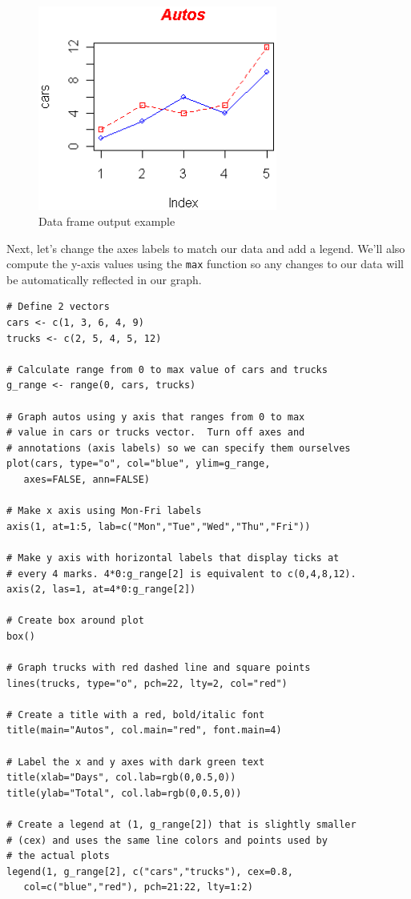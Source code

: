 \documentclass[10pt]{book}
\begin{document}
\begin{figure}[H]
    \begin{flushleft}
        \includegraphics[width=0.7\textwidth]{line_script3.png}
        \caption{Data frame output example}
        \label{fig:dataframe}
    \end{flushleft}
\end{figure}

Next, let's change the axes labels to match our data and add a legend. We'll also compute the y-axis values using the \texttt{max} function so any changes to our data will be automatically reflected in our graph.

\begin{lstlisting}
# Define 2 vectors
cars <- c(1, 3, 6, 4, 9)
trucks <- c(2, 5, 4, 5, 12)

# Calculate range from 0 to max value of cars and trucks
g_range <- range(0, cars, trucks)

# Graph autos using y axis that ranges from 0 to max 
# value in cars or trucks vector.  Turn off axes and 
# annotations (axis labels) so we can specify them ourselves
plot(cars, type="o", col="blue", ylim=g_range, 
   axes=FALSE, ann=FALSE)

# Make x axis using Mon-Fri labels
axis(1, at=1:5, lab=c("Mon","Tue","Wed","Thu","Fri"))

# Make y axis with horizontal labels that display ticks at 
# every 4 marks. 4*0:g_range[2] is equivalent to c(0,4,8,12).
axis(2, las=1, at=4*0:g_range[2])

# Create box around plot
box()

# Graph trucks with red dashed line and square points
lines(trucks, type="o", pch=22, lty=2, col="red")

# Create a title with a red, bold/italic font
title(main="Autos", col.main="red", font.main=4)

# Label the x and y axes with dark green text
title(xlab="Days", col.lab=rgb(0,0.5,0))
title(ylab="Total", col.lab=rgb(0,0.5,0))

# Create a legend at (1, g_range[2]) that is slightly smaller 
# (cex) and uses the same line colors and points used by 
# the actual plots 
legend(1, g_range[2], c("cars","trucks"), cex=0.8, 
   col=c("blue","red"), pch=21:22, lty=1:2)
\end{lstlisting}
\end{document}
